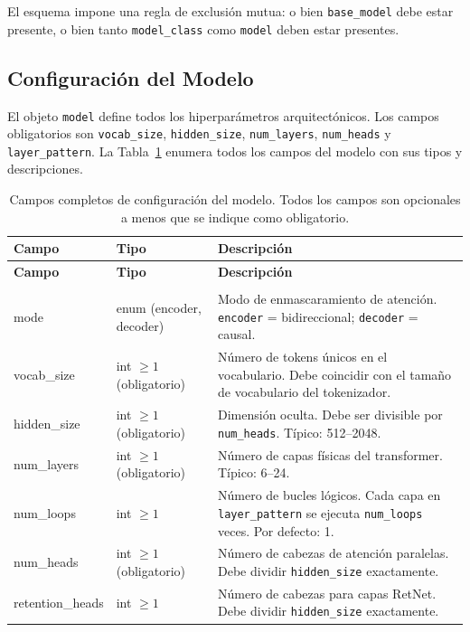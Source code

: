 El esquema impone una regla de exclusión mutua: o bien \texttt{base\_model} debe estar presente, o bien tanto \texttt{model\_class} como \texttt{model} deben estar presentes.

\subsection{Configuración del Modelo}
\label{subsec:model-config}

El objeto \texttt{model} define todos los hiperparámetros arquitectónicos. Los campos obligatorios son \texttt{vocab\_size}, \texttt{hidden\_size}, \texttt{num\_layers}, \texttt{num\_heads} y \texttt{layer\_pattern}. La Tabla~\ref{tab:model-fields} enumera todos los campos del modelo con sus tipos y descripciones.

\begin{longtable}{>{\ttfamily}l>{\raggedright\arraybackslash}p{3.5cm}>{\raggedright\arraybackslash}p{8.5cm}}
\toprule
\textbf{Campo} & \textbf{Tipo} & \textbf{Descripción} \\
\midrule
\endfirsthead
\toprule
\textbf{Campo} & \textbf{Tipo} & \textbf{Descripción} \\
\midrule
\endhead
\midrule
\multicolumn{3}{r}{\textit{continúa en la página siguiente}} \\
\endfoot
\bottomrule
\caption{Campos completos de configuración del modelo. Todos los campos son opcionales a menos que se indique como obligatorio.}
\label{tab:model-fields}
\endlastfoot
mode & enum (encoder, decoder) & Modo de enmascaramiento de atención. \texttt{encoder} = bidireccional; \texttt{decoder} = causal. \\
vocab\_size & int $\ge 1$ (obligatorio) & Número de tokens únicos en el vocabulario. Debe coincidir con el tamaño de vocabulario del tokenizador. \\
hidden\_size & int $\ge 1$ (obligatorio) & Dimensión oculta. Debe ser divisible por \texttt{num\_heads}. Típico: 512--2048. \\
num\_layers & int $\ge 1$ (obligatorio) & Número de capas físicas del transformer. Típico: 6--24. \\
num\_loops & int $\ge 1$ & Número de bucles lógicos. Cada capa en \texttt{layer\_pattern} se ejecuta \texttt{num\_loops} veces. Por defecto: 1. \\
num\_heads & int $\ge 1$ (obligatorio) & Número de cabezas de atención paralelas. Debe dividir \texttt{hidden\_size} exactamente. \\
retention\_heads & int $\ge 1$ & Número de cabezas para capas RetNet. Debe dividir \texttt{hidden\_size} exactamente. \\

\end{longtable}
